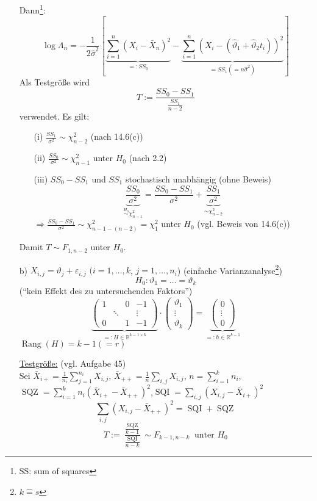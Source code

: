\documentclass[a4paper,11pt,twoside,titlepage]{article}
\newcommand{\R}{{\mathbb R}}
\begin{document}
\begin{itemize}
Dann\footnote{SS: sum of squares}:
\[\log\Lambda_n=-\frac{1}{2\hat\sigma^2}[\underbrace{\sum_{i=1}^n(X_i-\bar X_n)^2}_{=:SS_0}-\underbrace{\sum_{i=1}^n(X_i-(\hat\vartheta_1+\hat\vartheta_2t_i))^2}_{=SS_1(=n\hat\sigma^2)}]\]
Als Testgröße wird 
\[T:=\frac{SS_0-SS_1}{\frac{SS_1}{n-2}}\]
verwendet. Es gilt:
\begin{itemize}
\item[(i)] $\frac{SS_1}{\sigma^2}\sim\chi^2_{n-2}$ (nach 14.6(c))
\item[(ii)] $\frac{SS_0}{\sigma^2}\sim\chi^2_{n-1}$ unter $H_0$ (nach 2.2)
\item[(iii)] $SS_0-SS_1$ und $SS_1$ stochastisch unabhängig (ohne Beweis)
\[\underbrace{\frac{SS_0}{\sigma^2}}_{\stackrel{H_0}{\sim}\chi^2_{n-1}}=\frac{SS_0-SS_1}{\sigma^2}+\underbrace{\frac{SS_1}{\sigma^2}}_{\sim\chi^2_{n-2}}\]
$\Rightarrow \frac{SS_0-SS_1}{\sigma^2}\sim\chi^2_{n-1-(n-2)}=\chi^2_1$ unter $H_0$ (vgl. Beweis von 14.6(c))
\end{itemize}
Damit $T\sim F_{1,n-2}$ unter $H_0$.
\item[b)] $X_{i,j}=\vartheta_j+\varepsilon_{i,j}$ $(i=1,\ldots,k$, $j=1,\ldots,n_i$) (einfache Varianzanalyse\footnote{$k\hat=s$})
\[H_0:\vartheta_1=\ldots=\vartheta_k\]
("`kein Effekt des zu untersuchenden Faktors"')
\[\underbrace{\left(\begin{array}{cccc}1&&0&-1\\&\ddots&&\vdots\\0&&1&-1\end{array}\right)}_{=:H\in\R^{k-1\times k}}\cdot\left(\begin{array}{c}\vartheta_1\\\vdots\\\vartheta_k\end{array}\right)=\underbrace{\left(\begin{array}{c}0\\\vdots\\0\end{array}\right)}_{=:h\in\R^{k-1}}\]
$\operatorname{Rang}(H)=k-1(=r)$

\underline{Testgröße:} (vgl. Aufgabe 45)\\
Sei $\bar X_{i+}=\frac{1}{n_i}\sum_{j=1}^{n_i}X_{i,j}$, $\bar X_{++}=\frac{1}{n}\sum_{i,j}X_{i,j}$, $n=\sum_{i=1}^{k}n_i$,\\ $\operatorname{SQZ}=\sum_{i=1}^k n_i(\bar X_{i+}-\bar X_{++})^2$,$\operatorname{SQI}=\sum_{i,j}(X_{i,j}-\bar X_{i+})^2$ $$\sum_{i,j}(X_{i,j}-\bar X_{++})^2=\operatorname{SQI}+\operatorname{SQZ}$$
\[T:=\frac{\frac{\operatorname{SQZ}}{k-1}}{\frac{\operatorname{SQI}}{n-k}}\sim F_{k-1,n-k}\ \mbox{ unter }H_0\]
\end{itemize}
\newpage
\end{document}
